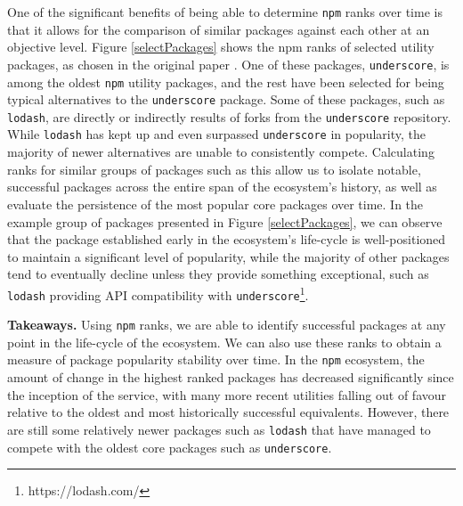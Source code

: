 \documentclass[10pt,conference]{IEEEtran}
\def\code#1{\texttt{#1}}
\begin{document}
One of the significant benefits of being able to determine
\code{npm} ranks over time is that it allows for the comparison
of similar packages against each other at an objective level.
Figure \ref{selectPackages} shows the npm ranks of selected 
utility packages, as chosen in the original paper \cite{Wittern:2016}.
One of these packages, \code{underscore}, is among the oldest \code{npm} 
utility packages, and the rest have been selected for being
typical alternatives to the \code{underscore} package. Some of these packages,
such as \code{lodash}, are directly or indirectly results of forks from the
\code{underscore} repository. While \code{lodash} has kept up and even surpassed
\code{underscore} in popularity, the majority of newer alternatives are unable
to consistently compete. Calculating ranks for similar groups of packages such as
this allow us to isolate notable, successful packages across the entire span of
the ecosystem's history, as well as evaluate the persistence of the most popular
core packages over time. In the example group of packages presented in Figure \ref{selectPackages},
we can observe that the package established early in the ecosystem's life-cycle
is well-positioned to maintain a significant level of popularity, while the majority of
other packages tend to eventually decline unless they provide something exceptional,
such as \code{lodash} providing API compatibility with \code{underscore}\footnote{https://lodash.com/}.

\textbf{Takeaways.} Using \code{npm} ranks, we are able to identify successful packages 
at any point in the life-cycle of the ecosystem. We can also use these
ranks to obtain a measure of package popularity stability over time. In 
the \code{npm} ecosystem, the amount of change in the highest ranked packages
has decreased significantly since the inception of the service, with many
more recent utilities falling out of favour relative to the oldest and most
historically successful equivalents. However, there are still some relatively newer 
packages such as \code{lodash} that have managed to compete with the oldest core packages
such as \code{underscore}.

\end{document}
